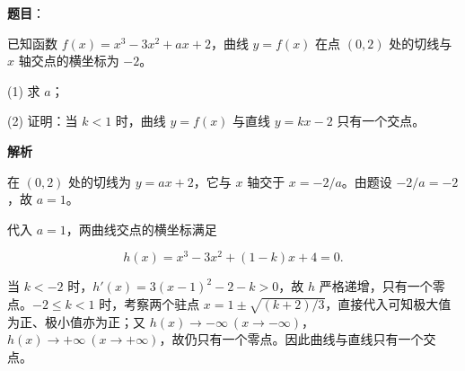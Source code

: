 \begin{answer}

\textbf{题目}：

已知函数 $f(x)=x^3-3x^2+ax+2$，曲线 $y=f(x)$ 在点 $(0,2)$ 处的切线与 $x$ 轴交点的横坐标为 $-2$。

(1) 求 $a$；

(2) 证明：当 $k<1$ 时，曲线 $y=f(x)$ 与直线 $y=kx-2$ 只有一个交点。

\textbf{解析}


在 $(0,2)$ 处的切线为 $y=ax+2$，它与 $x$ 轴交于 $x=-2/a$。由题设 $-2/a=-2$，故 $a=1$。


代入 $a=1$，两曲线交点的横坐标满足

\nopagebreak[4]
\[
h(x)=x^3-3x^2+(1-k)x+4=0.
\]

当 $k<-2$ 时，$h'(x)=3(x-1)^2-2-k>0$，故 $h$ 严格递增，只有一个零点。$-2\leqslant k<1$ 时，考察两个驻点 $x=1\pm\sqrt{(k+2)/3}$，直接代入可知极大值为正、极小值亦为正；又 $h(x)\to-\infty\ (x\to-\infty)$，$h(x)\to+\infty\ (x\to+\infty)$，故仍只有一个零点。因此曲线与直线只有一个交点。



\end{answer}
